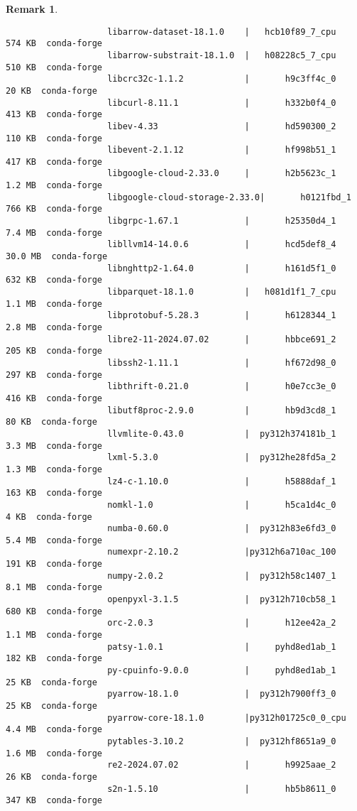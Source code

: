 \documentclass{article}
\newtheorem{remark}{Remark}
\begin{document}
\begin{itemize}
\begin{itemize}
\begin{itemize}
\begin{remark}
\begin{verbatim}
					libarrow-dataset-18.1.0    |   hcb10f89_7_cpu         574 KB  conda-forge
					libarrow-substrait-18.1.0  |   h08228c5_7_cpu         510 KB  conda-forge
					libcrc32c-1.1.2            |       h9c3ff4c_0          20 KB  conda-forge
					libcurl-8.11.1             |       h332b0f4_0         413 KB  conda-forge
					libev-4.33                 |       hd590300_2         110 KB  conda-forge
					libevent-2.1.12            |       hf998b51_1         417 KB  conda-forge
					libgoogle-cloud-2.33.0     |       h2b5623c_1         1.2 MB  conda-forge
					libgoogle-cloud-storage-2.33.0|       h0121fbd_1         766 KB  conda-forge
					libgrpc-1.67.1             |       h25350d4_1         7.4 MB  conda-forge
					libllvm14-14.0.6           |       hcd5def8_4        30.0 MB  conda-forge
					libnghttp2-1.64.0          |       h161d5f1_0         632 KB  conda-forge
					libparquet-18.1.0          |   h081d1f1_7_cpu         1.1 MB  conda-forge
					libprotobuf-5.28.3         |       h6128344_1         2.8 MB  conda-forge
					libre2-11-2024.07.02       |       hbbce691_2         205 KB  conda-forge
					libssh2-1.11.1             |       hf672d98_0         297 KB  conda-forge
					libthrift-0.21.0           |       h0e7cc3e_0         416 KB  conda-forge
					libutf8proc-2.9.0          |       hb9d3cd8_1          80 KB  conda-forge
					llvmlite-0.43.0            |  py312h374181b_1         3.3 MB  conda-forge
					lxml-5.3.0                 |  py312he28fd5a_2         1.3 MB  conda-forge
					lz4-c-1.10.0               |       h5888daf_1         163 KB  conda-forge
					nomkl-1.0                  |       h5ca1d4c_0           4 KB  conda-forge
					numba-0.60.0               |  py312h83e6fd3_0         5.4 MB  conda-forge
					numexpr-2.10.2             |py312h6a710ac_100         191 KB  conda-forge
					numpy-2.0.2                |  py312h58c1407_1         8.1 MB  conda-forge
					openpyxl-3.1.5             |  py312h710cb58_1         680 KB  conda-forge
					orc-2.0.3                  |       h12ee42a_2         1.1 MB  conda-forge
					patsy-1.0.1                |     pyhd8ed1ab_1         182 KB  conda-forge
					py-cpuinfo-9.0.0           |     pyhd8ed1ab_1          25 KB  conda-forge
					pyarrow-18.1.0             |  py312h7900ff3_0          25 KB  conda-forge
					pyarrow-core-18.1.0        |py312h01725c0_0_cpu         4.4 MB  conda-forge
					pytables-3.10.2            |  py312hf8651a9_0         1.6 MB  conda-forge
					re2-2024.07.02             |       h9925aae_2          26 KB  conda-forge
					s2n-1.5.10                 |       hb5b8611_0         347 KB  conda-forge

\end{verbatim}
\end{remark}
\end{itemize}
\end{itemize}
\end{itemize}
\end{document}

